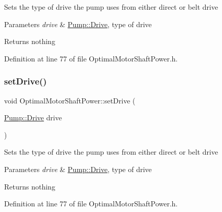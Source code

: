Sets the type of drive the pump uses from either direct or belt drive


\begin{DoxyParams}{Parameters}
{\em drive} & \hyperlink{class_pump_a32bf0ade131a11bb3b3fb374f638e983}{Pump\+::\+Drive}, type of drive\\
\hline
\end{DoxyParams}
\begin{DoxyReturn}{Returns}
nothing 
\end{DoxyReturn}


Definition at line 77 of file Optimal\+Motor\+Shaft\+Power.\+h.

\mbox{\label{class_optimal_motor_shaft_power_abd88cbdcba70dbb194a8f957b4467fc7}} 
\subsubsection{\texorpdfstring{set\+Drive()}{setDrive()}\hspace{0.1cm}{\footnotesize\ttfamily [3/3]}}
{\footnotesize\ttfamily void Optimal\+Motor\+Shaft\+Power\+::set\+Drive (\begin{DoxyParamCaption}\item[{\hyperlink{class_pump_a32bf0ade131a11bb3b3fb374f638e983}{Pump\+::\+Drive}}]{drive }\end{DoxyParamCaption})\hspace{0.3cm}{\ttfamily [inline]}}

Sets the type of drive the pump uses from either direct or belt drive


\begin{DoxyParams}{Parameters}
{\em drive} & \hyperlink{class_pump_a32bf0ade131a11bb3b3fb374f638e983}{Pump\+::\+Drive}, type of drive\\
\hline
\end{DoxyParams}
\begin{DoxyReturn}{Returns}
nothing 
\end{DoxyReturn}


Definition at line 77 of file Optimal\+Motor\+Shaft\+Power.\+h.

\mbox{\label{class_optimal_motor_shaft_power_ab2d80927fbaa62705359700b2a8f2f26}} 

